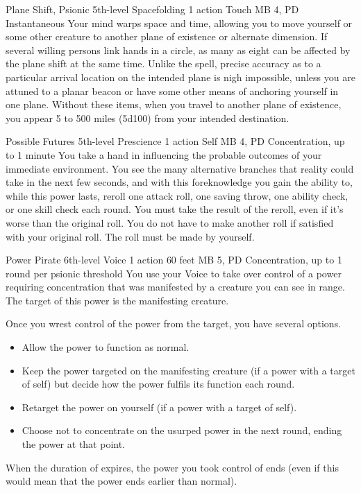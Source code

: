 \DndPowerHeader%
  {Plane Shift, Psionic}
  {5th-level Spacefolding}
  {1 action}
  {Touch}
  {MB 4, PD \lvlfive}
  {Instantaneous}
  Your mind warps space and time,
  allowing you to move yourself
  or some other creature to another plane of existence
  or alternate dimension.
  If several willing persons link hands in a circle,
  as many as eight can be affected by the plane shift at the same time.
  Unlike the  spell,
  precise accuracy as to a particular arrival location
  on the intended plane is nigh impossible,
  unless you are attuned to a planar beacon
  or have some other means of anchoring yourself in one plane.
  Without these items,
  when you travel to another plane of existence,
  you appear 5 to 500 miles (5d100) from your intended destination.

\DndPowerHeader%
  {Possible Futures}
  {5th-level Prescience}
  {1 action}
  {Self}
  {MB 4, PD \lvlfive}
  {Concentration, up to 1 minute}
  You take a hand in influencing the probable outcomes
  of your immediate environment.
  You see the many alternative branches that reality could take
  in the next few seconds,
  and with this foreknowledge you gain the ability to,
  while this power lasts,
  reroll one attack roll,
  one saving throw,
  one ability check,
  or one skill check each round.
  You must take the result of the reroll,
  even if it's worse than the original roll.
  You do not have to make another roll
  if satisfied with your original roll.
  The roll must be made by yourself.

\DndPowerHeader%
  {Power Pirate}
  {6th-level Voice}
  {1 action}
  {60 feet}
  {MB 5, PD \lvlsix}
  {Concentration, up to 1 round per psionic threshold}
  You use your Voice to take over control of a power
  requiring concentration that was manifested
  by a creature you can see in range.
  The target of this power is the manifesting creature.

  Once you wrest control of the power from the target,
  you have several options.
  \begin{itemize}
    \item Allow the power to function as normal.
    \item Keep the power targeted on the manifesting creature
          (if a power with a target of self) but decide how the power
          fulfils its function each round.
    \item Retarget the power on yourself (if a power with a target of self).
    \item Choose not to concentrate on the usurped power
            in the next round, ending the power at that point.
  \end{itemize}
When the duration of  expires,
the power you took control of ends
(even if this would mean that the power ends earlier than normal).

